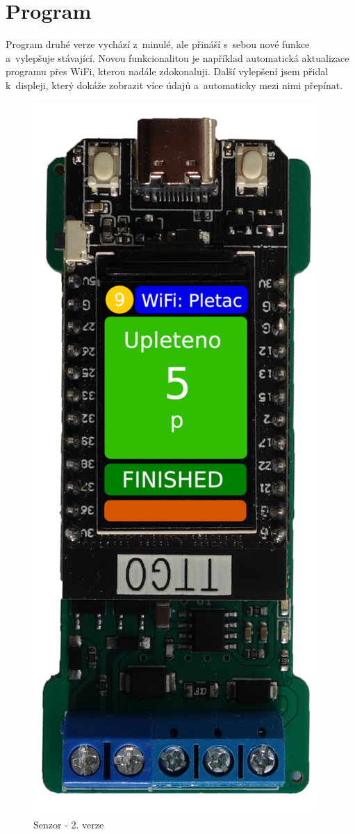 \section{Program}
Program druhé verze vychází z~minulé, ale přináší s~sebou nové funkce a~vylepšuje stávající.
Novou funkcionalitou je například automatická aktualizace programu přes WiFi, kterou nadále zdokonaluji.
Další vylepšení jsem přidal k~displeji, který dokáže zobrazit více údajů a~automaticky mezi nimi přepínat.

\begin{figure}[htbp]
    \centering
    \includegraphics[width=\textwidth/3]{img/V2-deska-esp-screen.png}
    \caption{Senzor - 2. verze}
    \label{fig:SenzorV2}
\end{figure}


\newpage